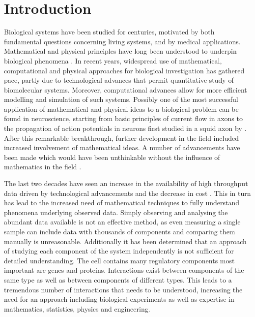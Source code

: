 
\chapter{Introduction}
\label{cha:introduction}

Biological systems have been studied for centuries, motivated by both fundamental questions concerning living systems, and by medical applications. Mathematical and physical principles have long been understood to underpin biological phenomena \citep{Lotka:1925tu, Rashevsky:1935jt}. In recent years,  widespread use of mathematical, computational and physical approaches for biological investigation has gathered pace, partly due to technological advances that permit quantitative study of biomolecular systems. Moreover, computational advances allow for more efficient modelling and simulation of such systems.
Possibly one of the most successful application of mathematical and physical ideas to a biological problem can be found in neuroscience, starting from basic principles of current flow in axons to the propagation of action potentials in neurons first studied in a
squid axon by \cite{Hodgkin:1952td}. After this remarkable breakthrough, further development in the field included increased involvement of mathematical ideas. A number of advancements have been made which would have been unthinkable without the influence of mathematics in the field \citep{Amari201348}.

The last two decades have seen an increase in the availability of high throughput data driven by technological advancements and the decrease in cost \citep{Schadt:2010dp}. This in turn has lead to the increased need of mathematical techniques to fully understand phenomena underlying observed data. Simply observing and analysing the abundant data available is not an effective method,
as even measuring a single sample can include data with thousands of components and comparing them manually is unreasonable.
Additionally it has been determined that an approach of studying each component of the system independently is not sufficient for detailed understanding.
The cell contains many regulatory components most important are genes and proteins. Interactions exist between components of the same type as well as between components of different types.
This leads to a tremendous number of interactions that needs to be understood, increasing the need for an approach including biological experiments as well as expertise in mathematics, statistics, physics and engineering.

